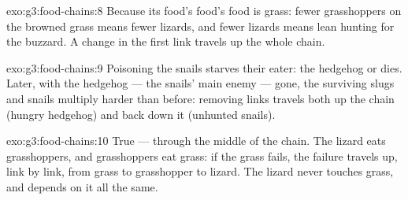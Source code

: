 \begin{solution}{exo:g3:food-chains:8}
Because its food's food's food is grass: fewer grasshoppers on
the browned grass means fewer lizards, and fewer lizards means
lean hunting for the buzzard. A change in the first link
travels up the whole chain.
\end{solution}

\begin{solution}{exo:g3:food-chains:9}
Poisoning the snails starves their eater: the hedgehog 
or dies. Later, with the hedgehog --- the snails' main enemy
--- gone, the surviving slugs and snails multiply harder than
before: removing links travels both up the chain (hungry
hedgehog) and back down it (unhunted snails).
\end{solution}

\begin{solution}{exo:g3:food-chains:10}
True --- through the middle of the chain. The lizard eats
grasshoppers, and grasshoppers eat grass: if the grass fails,
the failure travels up, link by link, from grass to grasshopper
to lizard. The lizard never touches grass, and depends on it
all the same.
\end{solution}
